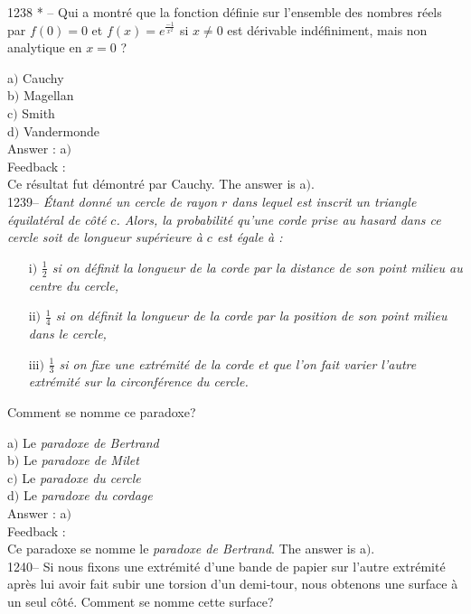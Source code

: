 ﻿\documentclass[letterpaper, 12pt]{article}
\begin{document}
1238 * -- Qui a montr\'e que la fonction d\'efinie sur l'ensemble
des nombres r\'eels par $f(0)=0$ et $f(x)=e^{\frac{-1}{x^2}}$ si
$x\not=0$ est d\'erivable ind\'efiniment, mais non analytique en
$x=0$ ?

a$)$ Cauchy \\
b$)$ Magellan \\
c$)$ Smith \\
d$)$ Vandermonde \\

Answer : a$)$\\

Feedback : \\
Ce r\'esultat fut d\'emontr\'e par Cauchy.
The answer is a$)$.\\

1239-- {\sl \'Etant donn\'e un cercle de rayon $r$ dans lequel est
inscrit un triangle \'equilat\'eral de c\^ot\'e $c$. Alors, la
probabilit\'e qu'une corde prise au hasard dans ce cercle soit de
longueur sup\'erieure \`a $c$ est \'egale \`a :}
\begin{enumerate}
\item[i$)$]{\sl $\frac12$ si on d\'efinit la longueur de la corde par la
distance de son point milieu au centre du cercle,}
\item[ii$)$]{\sl $\frac14$ si on d\'efinit la longueur de la corde par la
position de son point milieu dans le cercle,}
\item[iii$)$]{\sl $\frac13$ si on fixe une extr\'emit\'e de la corde et que
l'on fait varier l'autre extr\'emit\'e sur la circonf\'erence du cercle.}
\end{enumerate}
Comment se nomme ce paradoxe?

a$)$ Le {\sl paradoxe de Bertrand} \\
b$)$ Le {\sl paradoxe de Milet} \\
c$)$ Le {\sl paradoxe du cercle}  \\
d$)$ Le {\sl paradoxe du cordage}\\

Answer : a$)$\\

Feedback : \\
Ce paradoxe se nomme le {\sl paradoxe de Bertrand}.
The answer is a$)$.\\



1240-- Si nous fixons une extr\'emit\'e d'une bande de papier sur
l'autre extr\'emit\'e apr\`es lui avoir fait subir une torsion d'un
demi-tour, nous obtenons une surface \`a un seul c\^ot\'e. Comment
se nomme cette surface?
\end{document}
